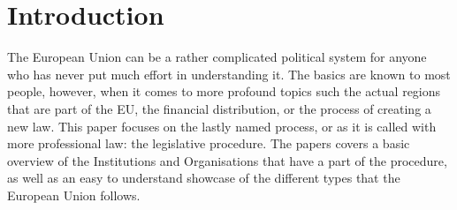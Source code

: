 \section{Introduction}
\label{sec:Introduction}

The European Union can be a rather complicated political system for anyone who has never put much effort in understanding it. The basics are known to most people, however, when it comes to more profound topics such the actual regions that are part of the EU, the financial distribution, or the process of creating a new law. This paper focuses on the lastly named process, or as it is called with more professional law: the legislative procedure. The papers covers a basic overview of the Institutions and Organisations that have a part of the procedure, as well as an easy to understand showcase of the different types that the European Union follows. 
\clearpage